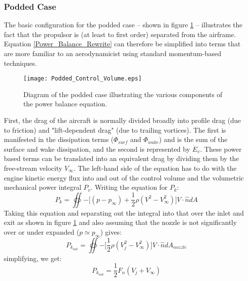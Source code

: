 				\subsubsection{\textbf{Podded Case}}
					The basic configuration for the podded case -- shown in figure \ref{Podded_Control_Volume} -- illustrates the fact that the propulsor is (at least to first order) separated from the airframe.  Equation \ref{Power_Balance_Rewrite} can therefore be simplified into terms that are more familiar to an aerodynamicist using standard momentum-based techniques.
						\begin{figure}[htp]
							\centering
							\texttt{[image: Podded\_Control\_Volume.eps]}
							\caption{Diagram of the podded case illustrating the various components of the power balance equation.}
							\label{Podded_Control_Volume}
						\end{figure}
					\vspace{15pt}
					\indent First, the drag of the aircraft is normally divided broadly into profile drag (due to friction) and "lift-dependent drag" (due to trailing vortices).  The first is manifested in the dissipation terms ($\Phi_{surf}$ and $\Phi_{wake}$) and is the sum of the surface and wake dissipation, and the second is represented by $\dot{E}_v$.  These power based terms can be translated into an equivalent drag by dividing them by the free-stream velocity $V_\infty$.
					\indent The left-hand side of the equation has to do  with the engine kinetic energy flux into and out of the control volume and the volumetric mechanical power integral $P_v$.  Writing the equation for $P_k$:
					\begin{equation}
						P_k = \oiint{-\big[(p-p_\infty) + \frac{1}{2}\rho(V^2-V_\infty^2)\big]V \cdot \hat{n} dA}
						\label{Pk_Equation}
					\end{equation}%
					Taking this equation and separating out the integral into that over the inlet and exit as shown in figure \ref{Podded_Control_Volume} and also assuming that the nozzle is not significantly over or under expanded ($p \simeq  p_\infty$) gives:
					\begin{equation}
						P_{k_{out}} = \oiint{-\big[\frac{1}{2}\rho(V_j^2-V_\infty^2)\big]V \cdot \hat{n}dA_{nozzle}}
						\label{Pk_Equation_Expanded}
					\end{equation}
					simplifying, we get:
					\begin{equation}
						P_{k_{out}} = \frac{1}{2} F_n (V_j + V_\infty)
						\label{Pk_Equation_Expanded_More}
					\end{equation}
